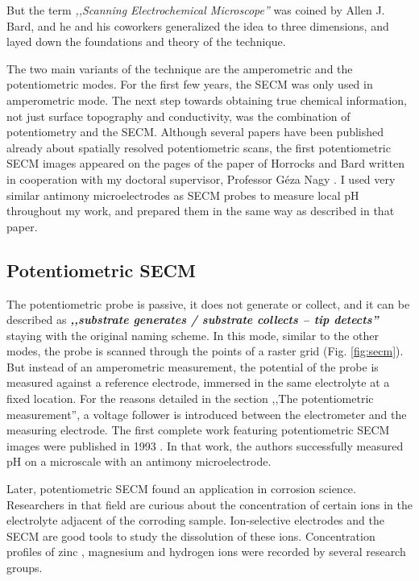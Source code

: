 But the term \emph{,,Scanning Electrochemical Microscope''} was coined by Allen J. Bard, and he and his coworkers generalized the idea to three dimensions, and layed down the foundations and theory of the technique. 

The two main variants of the technique are the amperometric and the potentiometric modes.
For the first few years, the SECM was only used in amperometric mode.
The next step towards obtaining true chemical information, not just surface topography and conductivity, was the combination of potentiometry and the SECM.
Although several papers have been published already about spatially resolved potentiometric scans, the first potentiometric SECM images appeared on the pages of the paper of Horrocks and Bard written in cooperation with my doctoral supervisor, Professor Géza Nagy \cite{horrocks1993scanning}.
I used very similar antimony microelectrodes as SECM probes to measure local pH throughout my work, and prepared them in the same way as described in that paper. 

\subsection{Potentiometric SECM}
The potentiometric probe is passive, it does not generate or collect, and it can be described as \textbf{\emph{,,substrate generates / substrate collects -- tip detects''}} staying with the original naming scheme.
In this mode, similar to the other modes, the probe is scanned through the points of a raster grid (Fig. \ref{fig:secm}).
But instead of an amperometric measurement, the potential of the probe is measured against a reference electrode, immersed in the same electrolyte at a fixed location.
For the reasons detailed in the section ,,The potentiometric measurement'', a voltage follower is introduced between the electrometer and the measuring electrode.
The first complete work featuring potentiometric SECM images were published in 1993 \cite{horrocks1993scanning}.
In that work, the authors successfully measured pH on a microscale with an antimony microelectrode. 

Later, potentiometric SECM found an application in corrosion science.
Researchers in that field are curious about the concentration of certain ions in the electrolyte adjacent of the corroding sample.
Ion-selective electrodes and the SECM are good tools to study the dissolution of these ions.
Concentration profiles of zinc \cite{bastos2010micropotentiometric}, magnesium \cite{lamaka2008monitoring, lamaka2009novel, karavai2010localized} and hydrogen ions \cite{lamaka2008monitoring} were recorded by several research groups.

